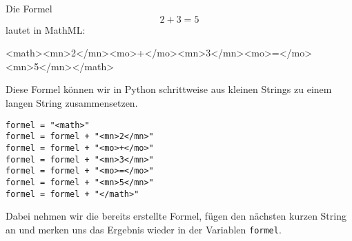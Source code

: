 Die Formel
\[
2 + 3 = 5
\]
lautet in MathML:

\begin{codeHTML}
<math><mn>2</mn><mo>+</mo><mn>3</mn><mo>=</mo><mn>5</mn></math>
\end{codeHTML}

Diese Formel können wir in Python schrittweise aus kleinen Strings zu einem langen String zusammensetzen. 

\lstset{style=syntaxPython}
\begin{lstlisting}
formel = "<math>"
formel = formel + "<mn>2</mn>"
formel = formel + "<mo>+</mo>"
formel = formel + "<mn>3</mn>"
formel = formel + "<mo>=</mo>"
formel = formel + "<mn>5</mn>"
formel = formel + "</math>"
\end{lstlisting}

Dabei nehmen wir die bereits erstellte Formel, fügen den nächsten kurzen String an und merken uns das Ergebnis wieder in der Variablen \texttt{formel}.